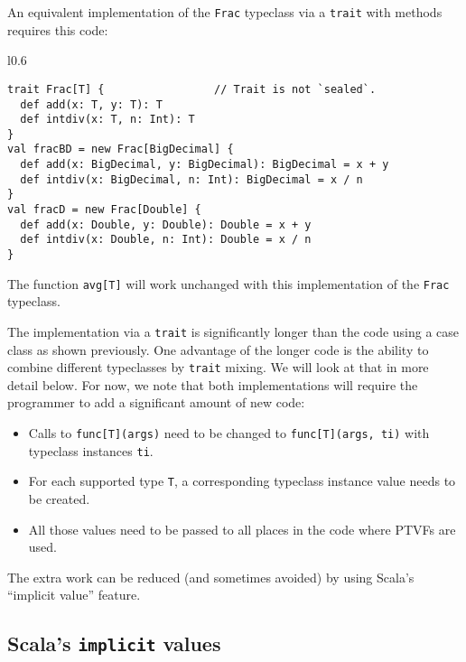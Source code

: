 An equivalent implementation of the \lstinline!Frac! typeclass via
a \lstinline!trait! with methods requires this code:

\begin{wrapfigure}{l}{0.6\columnwidth}%
\vspace{-0.65\baselineskip}
\begin{lstlisting}
trait Frac[T] {                 // Trait is not `sealed`.
  def add(x: T, y: T): T
  def intdiv(x: T, n: Int): T
}
val fracBD = new Frac[BigDecimal] {
  def add(x: BigDecimal, y: BigDecimal): BigDecimal = x + y
  def intdiv(x: BigDecimal, n: Int): BigDecimal = x / n
}
val fracD = new Frac[Double] {
  def add(x: Double, y: Double): Double = x + y
  def intdiv(x: Double, n: Int): Double = x / n
}
\end{lstlisting}

\vspace{-0.85\baselineskip}
\end{wrapfigure}%

\noindent The function \lstinline!avg[T]! will work unchanged with
this implementation of the \lstinline!Frac! typeclass.

The implementation via a \lstinline!trait! is significantly longer
than the code using a case class as shown previously. One advantage
of the longer code is the ability to combine different typeclasses
by \lstinline!trait! mixing. We will look at that in more detail
below. For now, we note that both implementations will require the
programmer to add a significant amount of new code:
\begin{itemize}
\item Calls to \lstinline!func[T](args)! need to be changed to \lstinline!func[T](args, ti)!
with typeclass instances \lstinline!ti!.
\item For each supported type \lstinline!T!, a corresponding typeclass
instance value needs to be created.
\item All those values need to be passed to all places in the code where
PTVFs are used.
\end{itemize}
The extra work can be reduced (and sometimes avoided) by using Scala's
``implicit value'' feature. 

\subsection{Scala's \texttt{implicit} values}

